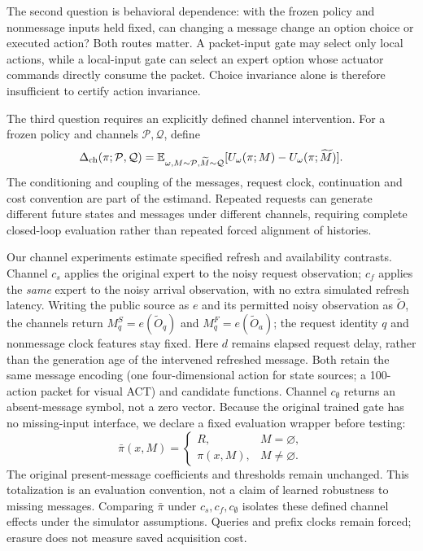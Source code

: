 The second question is behavioral dependence: with the frozen policy and nonmessage inputs held fixed, can changing a message change an option choice or executed action? Both routes matter. A packet-input gate may select only local actions, while a local-input gate can select an expert option whose actuator commands directly consume the packet. Choice invariance alone is therefore insufficient to certify action invariance.

The third question requires an explicitly defined channel intervention. For a frozen policy and channels $\mathcal P,\mathcal Q$, define
\begin{equation}\label{eq:channel}
 \Delta_{\rm ch}(\pi;\mathcal P,\mathcal Q)
 =\mathbb{E}_{\omega,M\sim\mathcal P,\widetilde M\sim\mathcal Q}
 [U_\omega(\pi;M)-U_\omega(\pi;\widetilde M)].
\end{equation}
The conditioning and coupling of the messages, request clock, continuation and cost convention are part of the estimand. Repeated requests can generate different future states and messages under different channels, requiring complete closed-loop evaluation rather than repeated forced alignment of histories.

Our channel experiments estimate specified refresh and availability contrasts. Channel $c_s$ applies the original expert to the noisy request observation; $c_f$ applies the \emph{same} expert to the noisy arrival observation, with no extra simulated refresh latency. Writing the public source as $e$ and its permitted noisy observation as $\widetilde O$, the channels return $M_q^S=e(\widetilde O_q)$ and $M_q^F=e(\widetilde O_a)$; the request identity $q$ and nonmessage clock features stay fixed. Here $d$ remains elapsed request delay, rather than the generation age of the intervened refreshed message. Both retain the same message encoding (one four-dimensional action for state sources; a 100-action packet for visual ACT) and candidate functions. Channel $c_\emptyset$ returns an absent-message symbol, not a zero vector. Because the original trained gate has no missing-input interface, we declare a fixed evaluation wrapper before testing:
\begin{equation}\label{eq:wrapper}
 \bar\pi(x,M)=\begin{cases}R,&M=\varnothing,\\\pi(x,M),&M\neq\varnothing.\end{cases}
\end{equation}
The original present-message coefficients and thresholds remain unchanged. This totalization is an evaluation convention, not a claim of learned robustness to missing messages. Comparing $\bar\pi$ under $c_s,c_f,c_\emptyset$ isolates these defined channel effects under the simulator assumptions. Queries and prefix clocks remain forced; erasure does not measure saved acquisition cost.


